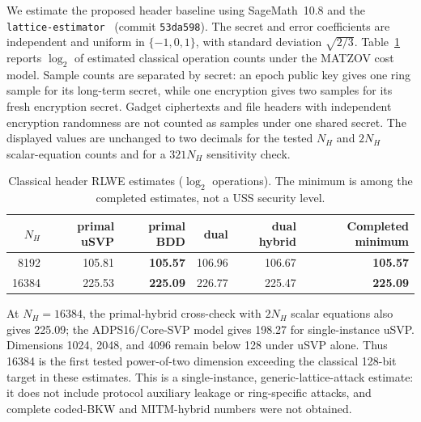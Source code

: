 We estimate the proposed header baseline using SageMath~10.8 and the \texttt{lattice-estimator}~\cite{APS15} (commit \texttt{53da598}). The secret and error coefficients are independent and uniform in $\{-1,0,1\}$, with standard deviation $\sqrt{2/3}$. Table~\ref{tab:header-estimator} reports $\log_2$ of estimated classical operation counts under the MATZOV cost model. Sample counts are separated by secret: an epoch public key gives one ring sample for its long-term secret, while one encryption gives two samples for its fresh encryption secret. Gadget ciphertexts and file headers with independent encryption randomness are not counted as samples under one shared secret. The displayed values are unchanged to two decimals for the tested $N_H$ and $2N_H$ scalar-equation counts and for a $321N_H$ sensitivity check.

\begin{table}[htbp]
\centering
\caption{Classical header RLWE estimates ($\log_2$ operations). The minimum is among the completed estimates, not a USS security level.}
\label{tab:header-estimator}
\small
\begin{tabular}{@{}rrrrrr@{}}
\toprule
$N_H$ & primal uSVP & primal BDD & dual & dual hybrid & Completed minimum \\
\midrule
8192 & 105.81 & \textbf{105.57} & 106.96 & 106.67 & \textbf{105.57} \\
16384 & 225.53 & \textbf{225.09} & 226.77 & 225.47 & \textbf{225.09} \\
\bottomrule
\end{tabular}
\end{table}

At $N_H=16384$, the primal-hybrid cross-check with $2N_H$ scalar equations also gives 225.09; the ADPS16/Core-SVP model gives 198.27 for single-instance uSVP. Dimensions 1024, 2048, and 4096 remain below 128 under uSVP alone. Thus 16384 is the first tested power-of-two dimension exceeding the classical 128-bit target in these estimates. This is a single-instance, generic-lattice-attack estimate: it does not include protocol auxiliary leakage or ring-specific attacks, and complete coded-BKW and MITM-hybrid numbers were not obtained.

